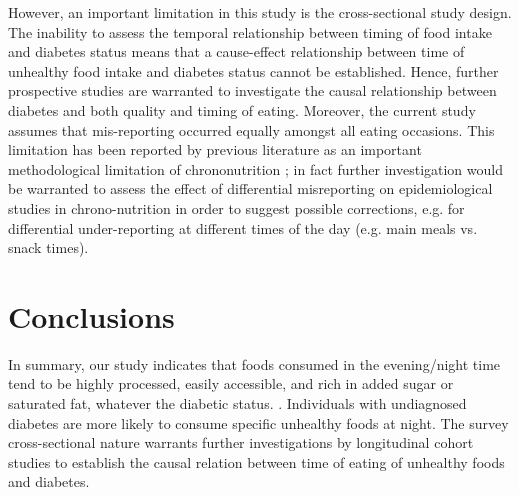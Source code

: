 \documentclass{bmcart}
\begin{document}
However, an important limitation in this study is the cross-sectional study design. The inability to assess the temporal relationship between timing of food intake and diabetes status means that a cause-effect relationship between time of unhealthy food intake and diabetes status cannot be established. Hence, further prospective studies are warranted to investigate the causal relationship between diabetes and both quality and timing of eating. Moreover, the current study assumes that mis-reporting occurred equally amongst all eating occasions. This limitation has been reported by previous literature as an important methodological limitation of chrononutrition \cite{FayetMoore2017}; in fact further investigation would be warranted to assess the effect of differential misreporting on epidemiological studies in chrono-nutrition in order to suggest possible corrections, e.g. for differential under-reporting at different times of the day (e.g. main meals vs. snack times). 


\section*{Conclusions}
In summary, our study indicates that foods consumed in the evening/night time tend to be highly processed, easily accessible, and rich in added sugar or saturated fat, whatever the diabetic status. . Individuals with undiagnosed diabetes are more likely to consume specific unhealthy foods at night. The survey cross-sectional nature warrants further investigations by longitudinal cohort studies to establish the causal relation between time of eating of unhealthy foods and diabetes.
\end{document}
